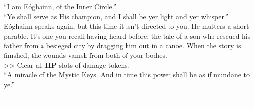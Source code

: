 “I am Eóghainn, of the Inner Circle.”\\

“Ye shall serve as His champion, and I shall be yer light and yer whisper.”\\

Eóghainn speaks again, but this time it isn’t directed to you. He mutters a short parable. It’s one you recall having heard before: the tale of a son who rescued his father from a besieged city by dragging him out in a canoe. When the story is finished, the wounds vanish from both of your bodies.\\
>> Clear all \textbf{HP} slots of damage tokens.\\

“A miracle of the Mystic Keys. And in time this power shall be as if mundane to ye.”\\

 -- \\
 -- 